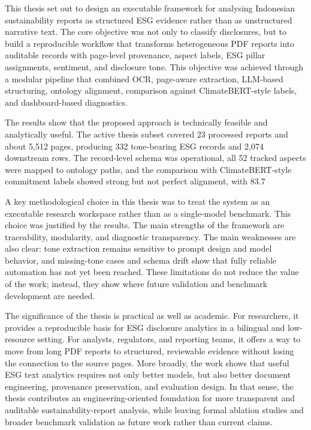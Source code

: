 This thesis set out to design an executable framework for analysing Indonesian sustainability reports as structured ESG evidence rather than as unstructured narrative text. The core objective was not only to classify disclosures, but to build a reproducible workflow that transforms heterogeneous PDF reports into auditable records with page-level provenance, aspect labels, ESG pillar assignments, sentiment, and disclosure tone. This objective was achieved through a modular pipeline that combined OCR, page-aware extraction, LLM-based structuring, ontology alignment, comparison against ClimateBERT-style labels, and dashboard-based diagnostics.

The results show that the proposed approach is technically feasible and analytically useful. The active thesis subset covered 23 processed reports and about 5,512 pages, producing 332 tone-bearing ESG records and 2,074 downstream rows. The record-level schema was operational, all 52 tracked aspects were mapped to ontology paths, and the comparison with ClimateBERT-style commitment labels showed strong but not perfect alignment, with 83.7%

A key methodological choice in this thesis was to treat the system as an executable research workspace rather than as a single-model benchmark. This choice was justified by the results. The main strengths of the framework are traceability, modularity, and diagnostic transparency. The main weaknesses are also clear: tone extraction remains sensitive to prompt design and model behavior, and missing-tone cases and schema drift show that fully reliable automation has not yet been reached. These limitations do not reduce the value of the work; instead, they show where future validation and benchmark development are needed.

The significance of the thesis is practical as well as academic. For researchers, it provides a reproducible basis for ESG disclosure analytics in a bilingual and low-resource setting. For analysts, regulators, and reporting teams, it offers a way to move from long PDF reports to structured, reviewable evidence without losing the connection to the source pages. More broadly, the work shows that useful ESG text analytics requires not only better models, but also better document engineering, provenance preservation, and evaluation design. In that sense, the thesis contributes an engineering-oriented foundation for more transparent and auditable sustainability-report analysis, while leaving formal ablation studies and broader benchmark validation as future work rather than current claims.
